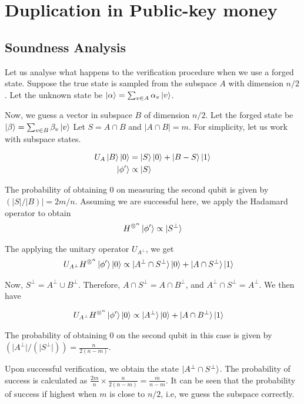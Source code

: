\documentclass[]{article}
\newcommand*{\xo}{\otimes}
\begin{document}
\section{Duplication in Public-key money}
\subsection{Soundness Analysis}
Let us analyse what happens to the verification procedure when we use a forged state. Suppose the true state is sampled from the subspace $A$ with dimension $n/2$. Let the unknown state be $\ket{\alpha} = \sum_{v \in A} \alpha_v \ket{v}$.

Now, we guess a vector in subspace $B$ of dimension $n/2$. Let the forged state be $\ket{\beta} = \sum_{v \in B} \beta_v \ket{v}$ Let $S = A \cap B$ and $| A \cap B | = m$. For simplicity, let us work with subspace states.

\begin{align}
    U_A \ket{B}\ket{0} &= \ket{S}\ket{0} +  \ket{B - S}\ket{1} \\ 
    \ket{\phi'} &\propto \ket{S}
\end{align}

The probability of obtaining $0$ on measuring the second qubit is given by $\left(\vert S \vert /\vert B\right) \vert = 2m/n$. Assuming we are successful here,  we apply the Hadamard operator to obtain
\begin{align}
    H^{\xo^n} \ket{\phi'} \propto \ket{S^\perp}
\end{align}

The applying the unitary operator $U_{A^\perp}$, we get
\begin{align}
    U_{A^\perp} H^{\xo^n} \ket{\phi'} \ket{0} &\propto \ket{A^\perp \cap S^\perp} \ket{0} + \ket{A \cap S^\perp} \ket{1}
\end{align}

Now, $S^\perp = A^\perp \cup B^\perp$. Therefore, $A \cap S^\perp = A \cap B^\perp$, and $A^\perp \cap S^\perp = A^\perp$. We then have

\begin{align}
    U_{A^\perp} H^{\xo^n} \ket{\phi'} \ket{0} &\propto \ket{A^\perp} \ket{0} + \ket{A \cap B^\perp} \ket{1}
\end{align}

The probability of obtaining $0$ on the second qubit in this case is given by $\left(\vert A^\perp \vert / (\vert S^\perp \vert) \right) = \frac{n}{2(n - m)}$.

Upon successful verification, we obtain the state $\ket{A^\perp \cap S^\perp}$. The probability of success is calculated as $\frac{2m}{n} \times \frac{n}{2(n - m)} = \frac{m}{n - m}$. It can be seen that the probability of success if highest when $m$ is close to $n/2$, i.e, we guess the subspace correctly.
\end{document}
